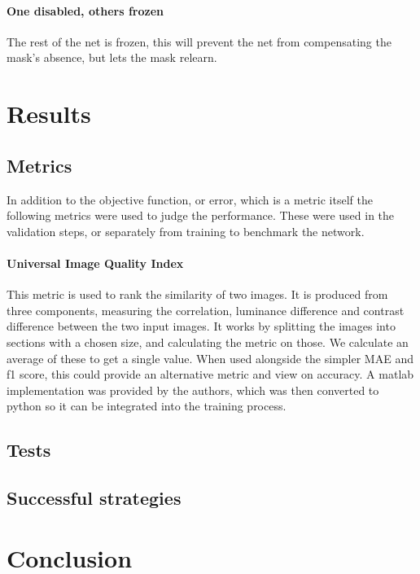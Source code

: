 \documentclass[a4paper,12pt]{article}
\begin{document}
\paragraph{One disabled, others frozen}The rest of the net is frozen, this will prevent the net from compensating the mask's absence, but lets the mask relearn.
\newpage
\section{Results}
\subsection{Metrics}
In addition to the objective function, or error, which is a metric itself the following metrics were used to judge the performance. These were used in the validation steps, or separately from training to benchmark the network.
\paragraph{Universal Image Quality Index}This metric is used to rank the similarity of two images. It is produced from three components, measuring the correlation, luminance difference and contrast difference between the two input images. It works by splitting the images into sections with a chosen size, and calculating the metric on those. We calculate an average of these to get a single value. When used alongside the simpler MAE and f1 score, this could provide an alternative metric and view on accuracy. A matlab implementation was provided by the authors, which was then converted to python so it can be integrated into the training process.
\subsection{Tests}
\subsection{Successful strategies}
\newpage
\section{Conclusion}
\begin{appendix}
\listoffigures
\listoftables
\end{appendix}
\end{document}
